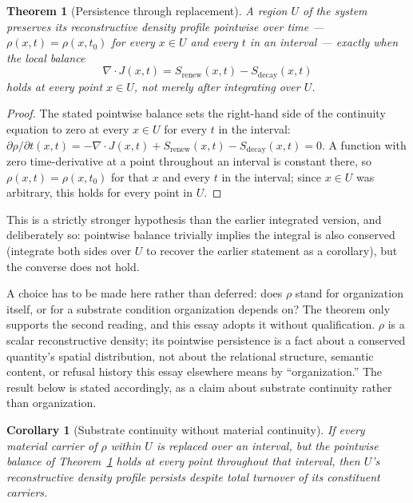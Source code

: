 \documentclass[11pt]{article}
\newtheorem{theorem}{Theorem}
\newtheorem{corollary}{Corollary}
\begin{document}
\begin{theorem}[Persistence through replacement]
\label{thm:persistence}
A region $U$ of the system preserves its reconstructive density profile pointwise over time --- $\rho(x,t)=\rho(x,t_0)$ for every $x\in U$ and every $t$ in an interval --- exactly when the local balance
\[
\nabla\cdot J(x,t) = S_{\mathrm{renew}}(x,t) - S_{\mathrm{decay}}(x,t)
\]
holds at every point $x\in U$, not merely after integrating over $U$.
\end{theorem}

\begin{proof}
The stated pointwise balance sets the right-hand side of the continuity equation to zero at every $x\in U$ for every $t$ in the interval: $\partial\rho/\partial t(x,t) = -\nabla\cdot J(x,t) + S_{\mathrm{renew}}(x,t)-S_{\mathrm{decay}}(x,t) = 0$. A function with zero time-derivative at a point throughout an interval is constant there, so $\rho(x,t)=\rho(x,t_0)$ for that $x$ and every $t$ in the interval; since $x\in U$ was arbitrary, this holds for every point in $U$.
\end{proof}

This is a strictly stronger hypothesis than the earlier integrated version, and deliberately so: pointwise balance trivially implies the integral is also conserved (integrate both sides over $U$ to recover the earlier statement as a corollary), but the converse does not hold.

A choice has to be made here rather than deferred: does $\rho$ stand for organization itself, or for a substrate condition organization depends on? The theorem only supports the second reading, and this essay adopts it without qualification. $\rho$ is a scalar reconstructive density; its pointwise persistence is a fact about a conserved quantity's spatial distribution, not about the relational structure, semantic content, or refusal history this essay elsewhere means by ``organization.'' The result below is stated accordingly, as a claim about substrate continuity rather than organization.

\begin{corollary}[Substrate continuity without material continuity]
\label{cor:ship-of-theseus}
If every material carrier of $\rho$ within $U$ is replaced over an interval, but the pointwise balance of Theorem~\ref{thm:persistence} holds at every point throughout that interval, then $U$'s reconstructive density profile persists despite total turnover of its constituent carriers.
\end{corollary}
\end{document}
